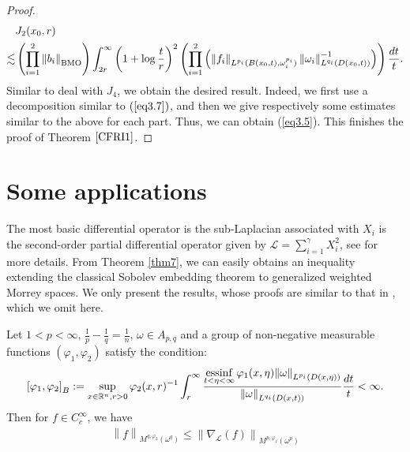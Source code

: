 \documentclass[11pt, twoside, leqno]{article}
\begin{document}
\begin{proof}[Proof]
	\begin{align}\label{eq3.14}
	&{J_2}({x_0},r)\notag\\ 
	\lesssim&\left( {\prod\limits_{i = 1}^2 {{{\left\| {{b_i}} \right\|}_{\rm BMO}}} } \right)\int_{2r}^\infty  {{{\left( {1 + \log \frac{t}{r}} \right)}^2}\left( {\prod\limits_{i = 1}^2 {\left( {{{\left\| {{f_i}} \right\|}_{{L^{{p_i}}}(B\left( {{x_0},t} \right),\omega _i^{{p_i}})}}\left\| {{\omega _i}} \right\|_{{L^{{q_i}}}(D\left( {{x_0},t} \right))}^{ - 1}} \right)} } \right)\frac{{dt}}{t}}.
	\end{align}
	Similar to deal with ${J_{4}}$, we obtain the desired result. Indeed,  we first use a decomposition similar to $(\ref{eq3.7})$, and then we give respectively some estimates similar to the above for each part. Thus, we can obtain (\ref{eq3.5}). This finishes the proof of Theorem $\ref{CFRI1}$.
\end{proof}
\section{Some applications}\label{sec4}
The most basic differential operator is the sub-Laplacian associated with $X_i$ is the second-order partial differential operator given by ${\mathcal L} = \sum\limits_{i = 1}^\gamma  {X_i^2}$, see \cite{Gu8} for more details. From Theorem \ref{thm7}, we can easily obtains an inequality extending the classical Sobolev embedding theorem to generalized weighted Morrey spaces. We only present the results, whose proofs are similar to that in \cite{Gu8}, which we omit here.

\begin{thm}
	Let $1 < p < \infty$, $\frac{1}{p} - \frac{1}{q} = \frac{1}{n}$, $\omega  \in {A_{p,q}}$ and a group of non-negative measurable functions $({{\varphi }_1},{\varphi _2})$ satisfy the condition:
	\begin{equation}\label{con8}
	{\left[ {{\varphi _1},{\varphi _2}} \right]_B}: = \mathop {\sup }\limits_{x \in {{\mathbb R^n}},r > 0} {\varphi _2}{(x,r)^{{\rm{ - }}1}}\int_r^\infty  {\frac{{\mathop {{\rm{essinf}}}\limits_{t < \eta  < \infty } {\varphi _1}(x,\eta ){{\left\| \omega  \right\|}_{{L^{{p_i}}}(D(x,\eta ))}}}}{{{{\left\| \omega  \right\|}_{{L^{{q_i}}}(D(x,t))}}}}\frac{{dt}}{t}}  < \infty.
	\end{equation}
	Then for $f \in C_c^\infty $, we have 
	\begin{align*}
	{\left\| f \right\|_{{M^{q,{\varphi _2}}}({\omega ^q})}} \le {\left\| {{\nabla _{\mathcal L}}(f)} \right\|_{{M^{p,{\varphi _1}}}({\omega ^p})}}
	\end{align*}
\end{thm}
\end{document}
